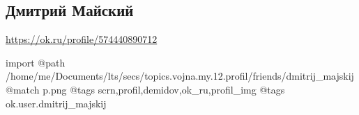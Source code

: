  
 
 
 
 

\subsection{Дмитрий Майский}

\url{https://ok.ru/profile/574440890712}

\ifcmt
 import
 @path /home/me/Documents/lts/secs/topics.vojna.my.12.profil/friends/dmitrij_majskij
 @match p.png
 @tags scrn,profil,demidov,ok_ru,profil_img
 @tags ok.user.dmitrij_majskij
\fi

